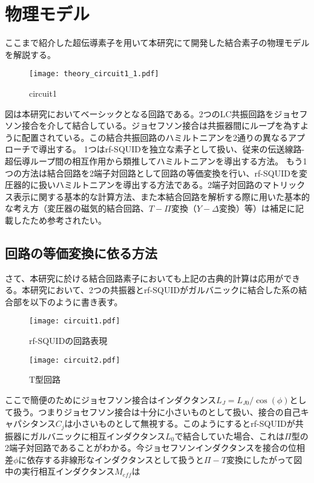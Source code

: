 \section{物理モデル}
ここまで紹介した超伝導素子を用いて本研究にて開発した結合素子の物理モデルを解説する。
\begin{figure}[H]
    \centering
    \texttt{[image: theory\_circuit1\_1.pdf]}
    \caption{circuit1}
\end{figure}
図は本研究においてベーシックとなる回路である。2つのLC共振回路をジョセフソン接合を介して結合している。ジョセフソン接合は共振器間にループを為すように配置されている。この結合共振回路のハミルトニアンを2通りの異なるアプローチで導出する。
1つはrf-SQUIDを独立な素子として扱い、従来の伝送線路-超伝導ループ間の相互作用から類推してハミルトニアンを導出する方法。
もう1つの方法は結合回路を2端子対回路として回路の等価変換を行い、rf-SQUIDを変圧器的に扱いハミルトニアンを導出する方法である。2端子対回路のマトリックス表示に関する基本的な計算方法、また本結合回路を解析する際に用いた基本的な考え方（変圧器の磁気的結合回路、$T-\Pi$変換（$Y-\Delta$変換）等）は補足に記載したため参考されたい。
\subsection{回路の等価変換に依る方法}
さて、本研究に於ける結合回路素子においても上記の古典的計算は応用ができる\cite*{Tian_2008}。本研究において、2つの共振器とrf-SQUIDがガルバニックに結合した系の結合部を以下のように書き表す。
\begin{figure}[H]
    \begin{minipage}[t]{0.5\columnwidth}
        \centering
        \texttt{[image: circuit1.pdf]}
        \caption{rf-SQUIDの回路表現}
    \end{minipage}%
    \begin{minipage}[t]{0.5\columnwidth}
        \centering
        \texttt{[image: circuit2.pdf]}
        \caption{T型回路}
    \end{minipage}
\end{figure}
ここで簡便のためにジョセフソン接合はインダクタンス$L_J = L_{J0}/\cos (\phi)$として扱う。つまりジョセフソン接合は十分に小さいものとして扱い、接合の自己キャパシタンス$C_j$は小さいものとして無視する。このようにするとrf-SQUIDが共振器にガルバニックに相互インダクタンス$L_0$で結合していた場合、これは$\Pi$型の2端子対回路であることがわかる。今ジョセフソンインダクタンスを接合の位相差$\phi$に依存する非線形なインダクタンスとして扱うと$\Pi-T$変換にしたがって図中の実行相互インダクタンス$M_{eff}$は

